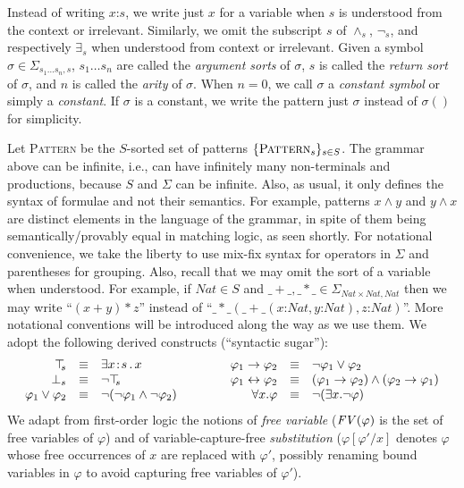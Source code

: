\documentclass[UTF8,11pt]{article}
\theoremstyle{plain}
\theoremstyle{definition}
\theoremstyle{remark}
\newcommand{\cln}{\texttt{:}}
\newcommand{\Nat}{\textit{Nat}}
\newcommand{\Pattern}{\textsc{Pattern}\xspace}
\newcommand{\ra}{\rightarrow}
\newcommand{\lra}{\leftrightarrow}
\newcommand{\FV}{{\it FV}}
\begin{document}
Instead of writing $x \cln s$, we write just $x$ for a variable when $s$ is 
understood from the context or irrelevant.
Similarly, we omit the subscript $s$ of $\wedge_s$, $\neg_s$, and respectively
$\exists_s$ when understood from context or irrelevant.
Given a symbol $\sigma \in \Sigma_{s_1 \ldots s_n,s}$, $s_1 \ldots s_n$ are 
called the \emph{argument sorts} of $\sigma$, $s$ is called the 
\emph{return sort} of $\sigma$, and $n$ is called the \emph{arity} of
$\sigma$.
When $n = 0$, we call $\sigma$ a \emph{constant symbol} or simply a 
\emph{constant}.
If $\sigma$ is a constant, we write the pattern just $\sigma$ instead of 
$\sigma()$ for 
simplicity.

Let \Pattern be the $S$-sorted set of patterns $\{\Pattern_s\}_{s\in S}$.
The grammar above can be infinite, i.e., can have infinitely many
non-terminals and productions, because $S$ and $\Sigma$ can be
infinite.
Also, as usual, it only defines the syntax of formulae and not
their semantics.
For example, patterns $x \wedge y$ and $y \wedge x$ are distinct elements in
the language of the grammar, in spite of them being semantically/provably
equal in matching logic, as seen shortly.
For notational convenience, we take the liberty to use mix-fix syntax for
operators in $\Sigma$ and parentheses for grouping.
Also, recall that we may omit the sort of a variable when understood.
For example, if $\Nat \in S$ and
$\_+\_, \_*\_ \in \Sigma_{\Nat \times \Nat, \Nat}$
then we may write ``$(x + y)*z$'' instead of
``$\_*\_(\_+\_(x\cln\Nat,y\cln\Nat),z\cln\Nat)$''.
More notational conventions will be introduced along the way
as we use them. 
We adopt the following derived constructs (``syntactic sugar''): %
$$\begin{array}{rcl@{\hspace*{10ex}}rcl}
\top_{\!\!s} & \equiv & \exists x\!:\!s \,.\, x &
\varphi_1 \ra \varphi_2 & \equiv & \neg\varphi_1 \vee \varphi_2 \\
\bot_{s} & \equiv & \neg \top_{\!\!s} &
\varphi_1 \lra \varphi_2 & \equiv & (\varphi_1 \ra \varphi_2) \wedge
 (\varphi_2 \ra \varphi_1) \\
\varphi_1 \vee \varphi_2 & \equiv & \neg(\neg\varphi_1\wedge\neg\varphi_2) &
\forall x . \varphi & \equiv & \neg(\exists x . \neg\varphi) \\
\end{array}
$$
We adapt from first-order logic the notions of \emph{free variable}
($\FV(\varphi)$ is the set of free variables of $\varphi$) and of
variable-capture-free \emph{substitution} ($\varphi[\varphi'/x]$ denotes
$\varphi$ whose free occurrences of $x$ are replaced with $\varphi'$, possibly
renaming bound variables in $\varphi$ to avoid capturing free variables of
$\varphi'$).
\end{document}
